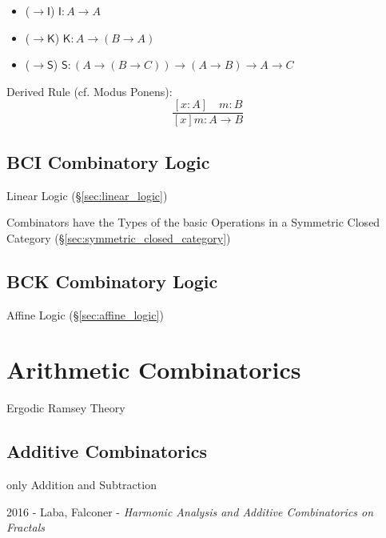 \begin{itemize}
  \item ($\rightarrow \mathsf{I}$) $\mathsf{I}: A \rightarrow A$
  \item ($\rightarrow \mathsf{K}$)
    $\mathsf{K}: A \rightarrow (B \rightarrow A)$
  \item ($\rightarrow \mathsf{S}$)
    $\mathsf{S}: (A \rightarrow (B \rightarrow C))
      \rightarrow (A \rightarrow B) \rightarrow A \rightarrow C$
\end{itemize}

Derived Rule (cf. Modus Ponens):
\[
  \frac{
    [x:A] \quad m:B
  }{
    [x]m:A \rightarrow B
  }
\]



\subsection{BCI Combinatory Logic}\label{sec:bci_logic}

Linear Logic (\S\ref{sec:linear_logic})

Combinators have the Types of the basic Operations in a Symmetric
Closed Category (\S\ref{sec:symmetric_closed_category})


\subsection{BCK Combinatory Logic}\label{sec:bck_logic}

Affine Logic (\S\ref{sec:affine_logic})



\section{Arithmetic Combinatorics}\label{sec:arithmetic_combinatorics}

Ergodic Ramsey Theory



\subsection{Additive Combinatorics}\label{sec:additive_combinatorics}

only Addition and Subtraction

2016 - Laba, Falconer - \emph{Harmonic Analysis and Additive Combinatorics on
  Fractals}
